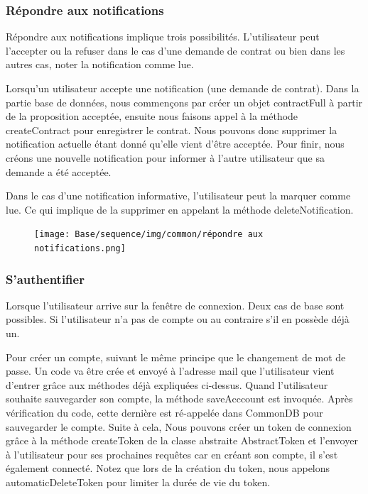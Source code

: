\newpage
\subsubsection{Répondre aux notifications}

\begin{flushleft}
Répondre aux notifications implique trois possibilités. L'utilisateur peut l'accepter ou la refuser dans le cas d'une demande de contrat ou bien dans les autres cas, noter la notification comme lue.
\end{flushleft}

\begin{flushleft}
Lorsqu'un utilisateur accepte une notification (une demande de contrat). Dans la partie base de données, nous commençons par créer un objet contractFull à partir de la proposition acceptée, ensuite nous faisons appel à la méthode createContract pour enregistrer le contrat. Nous pouvons donc supprimer la notification actuelle étant donné qu'elle vient d'être acceptée. Pour finir, nous créons une nouvelle notification pour informer à l'autre utilisateur que sa demande a été acceptée.
\end{flushleft}

\begin{flushleft}
Dans le cas d'une notification informative, l'utilisateur peut la marquer comme lue. Ce qui implique de la supprimer en appelant la méthode deleteNotification.
\end{flushleft}

\begin{figure}[h]
\centering
\texttt{[image: Base/sequence/img/common/répondre aux notifications.png]}
\end{figure}

\newpage

\subsubsection{S'authentifier}

\begin{flushleft}
Lorsque l'utilisateur arrive sur la fenêtre de connexion. Deux cas de base sont possibles. Si l'utilisateur n'a pas de compte ou au contraire s'il en possède déjà un.
\end{flushleft}

\begin{flushleft}
Pour créer un compte, suivant le même principe que le changement de mot de passe. Un code va être crée et envoyé à l'adresse mail que l'utilisateur vient d'entrer grâce aux méthodes déjà expliquées ci-dessus. Quand l'utilisateur souhaite sauvegarder son compte, la méthode saveAcccount est invoquée. Après vérification du code, cette dernière est ré-appelée dans CommonDB pour sauvegarder le compte.
\newline
Suite à cela, Nous pouvons créer un token de connexion grâce à la méthode createToken de la classe abstraite AbstractToken et l'envoyer à l'utilisateur pour ses prochaines requêtes car en créant son compte, il s'est également connecté. Notez que lors de la création du token, nous appelons automaticDeleteToken pour limiter la durée de vie du token.
\end{flushleft}

